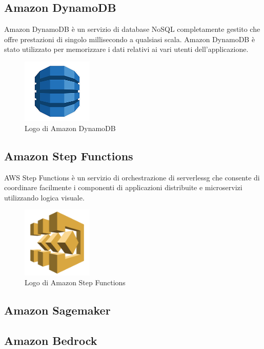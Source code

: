 \subsection{Amazon DynamoDB}
Amazon DynamoDB è un servizio di database NoSQL completamente gestito che offre prestazioni di singolo millisecondo a qualsiasi scala. Amazon DynamoDB è stato utilizzato per memorizzare i dati relativi ai vari utenti dell'applicazione.

\begin{figure}[h]
  \centering
  \includegraphics[width=0.3\textwidth]{img/tecnologie/DynamoDB.png}
  \caption{Logo di Amazon DynamoDB}
  \label{fig:dynamodb}
\end{figure}

\subsection{Amazon Step Functions}
AWS Step Functions è un servizio di orchestrazione di \gls{serverlessg} che consente di coordinare facilmente i componenti di applicazioni distribuite e microservizi utilizzando logica visuale. 

\begin{figure}[h]
  \centering
  \includegraphics[width=0.3\textwidth]{img/tecnologie/stepfunctions.png}
  \caption{Logo di Amazon Step Functions}
  \label{fig:stepfunctions}
\end{figure}

\subsection{Amazon Sagemaker}

\subsection{Amazon Bedrock}

